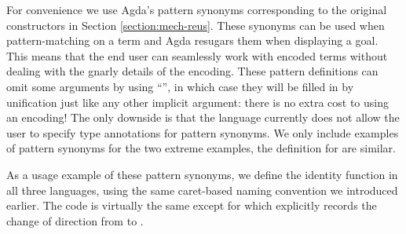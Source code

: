 \begin{center}
\begin{minipage}[t]{0.4\textwidth}
\end{minipage}\qquad
\begin{minipage}[t]{0.5\textwidth}
\end{minipage}
\end{center}

For convenience we use Agda's pattern synonyms corresponding to the
original constructors in Section \ref{section:mech-reus}. These
synonyms can be used when pattern-matching on a term and Agda resugars
them when displaying a goal. This means that the end user can
seamlessly work with encoded terms without dealing with the gnarly
details of the encoding.  These pattern definitions can omit some
arguments by using ``\AS{\_}'', in which case they will be filled in
by unification just like any other implicit argument: there is no
extra cost to using an encoding!  The only downside is that the
language currently does not allow the user to specify type annotations
for pattern synonyms. We only include examples of pattern synonyms
for the two extreme examples, the definition for  are similar.

\begin{center}
\begin{minipage}{0.40\textwidth}
\end{minipage}\hspace{2.5em}
\begin{minipage}{0.50\textwidth}
\end{minipage}
\end{center}

As a usage example of these pattern synonyms, we define the identity
function in all three languages, using the
same caret-based naming convention we introduced earlier. The code
is virtually the same except for  which explicitly records
the change of direction from  to .

\begin{center}
\begin{minipage}{0.28\textwidth}
\end{minipage}\quad
\begin{minipage}{0.30\textwidth}
\end{minipage}\quad
\begin{minipage}{0.32\textwidth}
\end{minipage}
\end{center}


